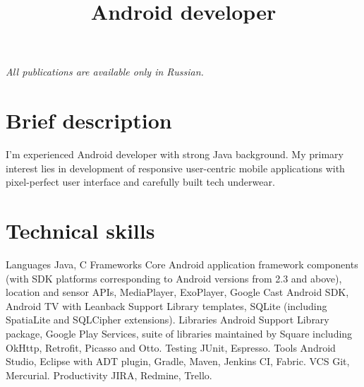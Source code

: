 
\makeatletter
\renewcommand*{\quotefont}{\normalfont}
\renewcommand*{\quotestyle}[1]{{\quotefont\textcolor{color2}{#1}}}
\makeatother

\makeatletter
\renewcommand\@makefnmark{\hbox{\@textsuperscript{\normalfont\color{color2}\@thefnmark}}}
\makeatother

\renewcommand*{\mobilephonesymbol}{\fixedphonesymbol}
\apptocmd
    {\bibliographyhead}
    {\cvline
        {}
        {\textit{All publications are available only in Russian.}\smallskip}
    }
    {}{}
    

\title{Android developer}
\address{Kyiv, Ukraine}



\makecvtitle

\section{Brief description}
\cvline
    {}
    {I'm experienced Android developer with strong Java background. My primary 
    interest lies in development of responsive user-centric mobile applications 
    with pixel-perfect user interface and carefully built tech underwear.}


\medskip
\section{Technical skills}
\cvitem
    {Languages}
    {Java, C}
\cvitem
    {Frameworks}
    {Core Android application framework components (with SDK platforms 
    corresponding to Android versions from 2.3 and above), 
    location and sensor APIs, MediaPlayer, ExoPlayer, Google Cast Android SDK, 
    Android TV with Leanback Support Library templates, SQLite (including 
    SpatiaLite and SQLCipher extensions).}
\cvitem
    {Libraries}
    {Android Support Library package, Google Play Services, suite of libraries 
    maintained by Square including OkHttp, Retrofit, Picasso and Otto.}
\cvitem
    {Testing}
    {JUnit, Espresso.}
\cvitem
    {Tools}
    {Android Studio, Eclipse with ADT plugin, Gradle, Maven, Jenkins CI, 
    Fabric.}
\cvitem
    {VCS}
    {Git, Mercurial.}
\cvitem
    {Productivity}
    {JIRA, Redmine, Trello.}
    

